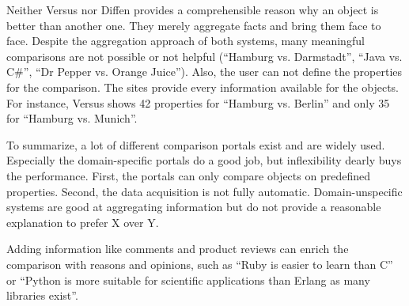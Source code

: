 Neither Versus nor Diffen provides a comprehensible reason why an object is better than another one. They merely aggregate facts and bring them face to face. Despite the aggregation approach of both systems, many meaningful comparisons are not possible or not helpful (\enquote{Hamburg vs. Darmstadt}, \enquote{Java vs. C\#}, \enquote{Dr Pepper vs. Orange Juice}).
Also, the user can not define the properties for the comparison. The sites provide every information available for the objects. For instance, Versus shows 42 properties for \enquote{Hamburg vs. Berlin} and only 35 for \enquote{Hamburg vs. Munich}.
\newline

To summarize, a lot of different comparison portals exist and are widely used. Especially the domain-specific portals do a good job, but inflexibility dearly buys the performance. First, the portals can only compare objects on predefined properties. Second, the data acquisition is not fully automatic. Domain-unspecific systems are good at aggregating information but do not provide a reasonable explanation to prefer X over Y.

Adding information like comments and product reviews can enrich the comparison with reasons and opinions, such as \enquote{Ruby is easier to learn than C} or \enquote{Python is more suitable for scientific applications than Erlang as many libraries exist}.